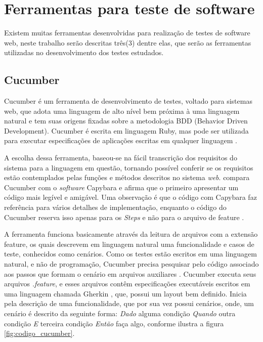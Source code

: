 \documentclass[tg]{mdtufsm}
\begin{document}
\section{Ferramentas para teste de software}
Existem muitas ferramentas desenvolvidas para realização de testes de software web, neste trabalho serão descritas três(3) dentre elas, que serão as ferramentas utilizadas no desenvolvimento dos testes estudados.

\subsection{Cucumber}
Cucumber é um ferramenta de desenvolvimento de testes, voltado para sistemas web, que adota uma linguagem de alto nível bem próxima à uma linguagem natural e tem suas origens fixadas sobre a metodologia BDD (Behavior Driven Development). Cucumber é escrita em linguagem Ruby, mas pode ser utilizada para executar especificações de aplicações escritas em qualquer linguagem \cite{nunescucumber}.

A escolha dessa ferramenta, baseou-se na fácil transcrição dos requisitos do sistema para a linguagem em questão, tornando possível conferir se os requisitos estão contemplados pelas funções e métodos descritos no sistema \emph{web}. \citeauthor{lopescucumbervalor}\cite{lopescucumbervalor} compara Cucumber com o \emph{software} Capybara e afirma que o primeiro apresentar um código mais legível e amigável. Uma observação é que o código com Capybara faz referência para vários detalhes de implementação, enquanto o código do Cucumber reserva isso apenas para os \emph{Steps} e não para o arquivo de feature \cite{lopescucumbervalor}.

A ferramenta funciona basicamente através da leitura de arquivos com a extensão feature, os quais descrevem em linguagem natural uma funcionalidade e casos de teste, conhecidos como cenários.
Como os testes estão escritos em uma linguagem natural, e não de programação, Cucumber precisa pesquisar pelo código associado aos passos que formam o cenário em arquivos auxiliares \cite{scmitzcucumberreview}. Cucumber executa seus arquivos \emph{.feature}, e esses arquivos contêm especificações executáveis escritos em uma linguagem chamada Gherkin \cite{cucumberwiki}, que, possui um layout bem definido. Inicia pela descrição de uma funcionalidade, que por sua vez possui cenários, onde, um cenário é descrito da seguinte forma: \emph{Dado} alguma condição \emph{Quando} outra condição \emph{E} terceira condição \emph{Então} faça algo, conforme ilustra a figura \ref{fig:codigo_cucumber}.
\end{document}

